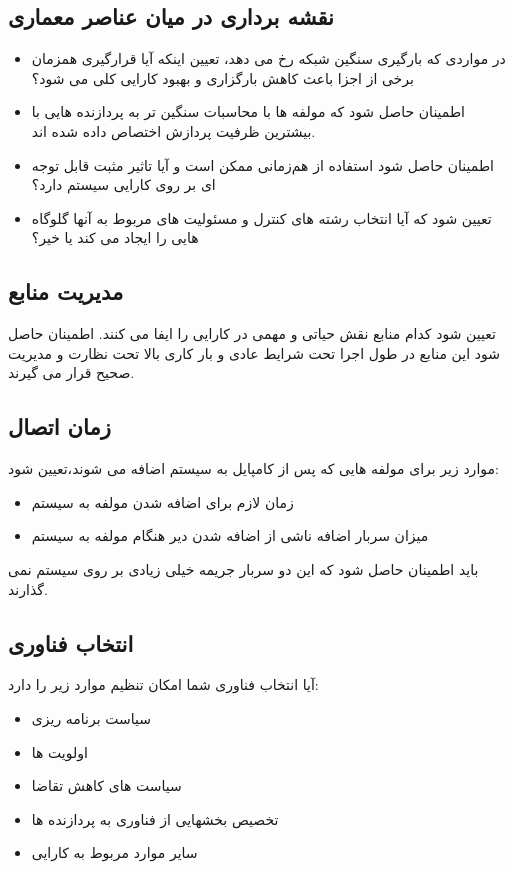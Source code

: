 \subsection{نقشه برداری در میان عناصر معماری}
\begin{itemize}
\item
در مواردی که بارگیری سنگین شبکه رخ می دهد، تعیین اینکه آیا قرارگیری همزمان برخی از اجزا باعث کاهش بارگزاری و بهبود کارایی کلی می شود؟
\item
اطمینان حاصل شود که مولفه ها با محاسبات سنگین تر به پردازنده هایی با بیشترین ظرفیت پردازش اختصاص داده شده اند.
\item
اطمینان حاصل شود استفاده از هم‌زمانی ممکن است و آیا تاثیر مثبت قابل توجه ای بر روی کارایی سیستم دارد؟
\item
تعیین شود که آیا انتخاب رشته های کنترل و مسئولیت های مربوط به آنها گلوگاه هایی را ایجاد می کند یا خیر؟
\end{itemize}
\subsection{مدیریت منابع}
تعیین شود کدام منابع نقش حیاتی و مهمی در کارایی را ایفا می کنند. اطمینان حاصل شود این منابع در طول اجرا تحت شرایط عادی و بار کاری بالا تحت نظارت و مدیریت صحیح قرار می گیرند.
\subsection{زمان اتصال}
موارد زیر برای مولفه هایی که پس از کامپایل  به سیستم اضافه می شوند،‌تعیین شود:
\begin{itemize}
\item
زمان لازم برای اضافه شدن مولفه به سیستم
\item
میزان سربار اضافه ناشی از اضافه شدن دیر هنگام مولفه به سیستم
\end{itemize}
باید اطمینان حاصل شود که این دو سربار جریمه خیلی زیادی بر روی سیستم نمی گذارند.
\subsection{انتخاب فناوری}
آیا انتخاب فناوری شما امکان تنظیم موارد زیر را دارد:
\begin{itemize}
\item
سیاست برنامه ریزی
\item
اولویت ها
\item
سیاست های کاهش تقاضا
\item
تخصیص بخشهایی از فناوری به پردازنده ها
\item
سایر موارد مربوط به کارایی
\end{itemize}





